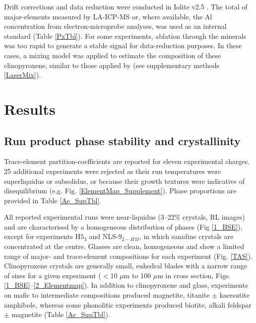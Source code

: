 \documentclass[review,authoryear,12pt]{elsarticle}
\begin{document}
Drift corrections and data reduction were conducted in Iolite v2.5 \citep{Paton2011}. The total of major-elements measured by LA-ICP-MS or, where available, the Al concentration from electron-microprobe analyses, was used as an internal standard (Table \ref{PxTbl}). For some experiments, ablation through the minerals was too rapid to generate a stable signal for data-reduction purposes. In these cases, a mixing model was applied to estimate the composition of these clinopyroxene, similar to those applied by \citet{Rubatto2007,Yang_InPrep}(see supplementary methods \ref{LaserMix}). %

\section{Results}
\subsection{Run product phase stability and crystallinity}
Trace-element partition-coefficients are reported for eleven experimental charges. 25 additional experiments were rejected as their run temperatures were superliquidus or subsolidus, or because their growth textures were indicative of disequilibrium (e.g. Fig. \ref{ElementMap_Supplement}). Phase proportions are provided in Table \ref{Ae_SupTbl}.

All reported experimental runs were near-liquidus (3--22\% crystals, RL images)
and are characterised by a homogeneous distribution of phases (Fig \ref{1_BSE}), except for experiments H$5_3$ and NLS-$9_{2-HM}$, in which sanidine crystals are concentrated at the centre. Glasses are clean, homogeneous and show a limited range of major- and trace-element compositions for each experiment (Fig. \ref{TAS}). Clinopyroxene crystals are generally small, euhedral blades with a narrow range of sizes for a given experiment ($<$10 $\mu$m to 100 $\mu$m in cross section, Figs. \ref{1_BSE}--\ref{2_Elementmap}). In addition to clinopyroxene and glass, experiments on mafic to intermediate compositions produced magnetite, titanite $\pm$ kaersutite amphibole, whereas some phonolitic experiments produced biotite, alkali feldspar $\pm$ magnetite (Table \ref{Ae_SupTbl}). 
\end{document}
